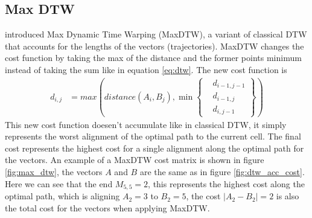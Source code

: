 \subsection{Max DTW}
\textcite{zhao2018rest} introduced Max Dynamic Time Warping (MaxDTW), a variant of classical DTW that accounts for the lengths of the vectors (trajectories). MaxDTW changes the cost function by taking the max of the distance and the former points minimum instead of taking the sum like in equation \ref{eq:dtw}. The new cost function is
\begin{equation}
    \label{eq:max_dtw}
    \begin{aligned}
        d_{i, j} & = max(distance(A_{i}, B_{j}), \min \left\{ \begin{aligned}
                                                                   & d_{i-1, j-1} \\
                                                                   & d_{i-1, j}   \\
                                                                   & d_{i, j-1}
                                                              \end{aligned} \right\})
    \end{aligned}
\end{equation}
This new cost function doesen't accumulate like in classical DTW, it simply represents the worst alignment of the optimal path to the current cell. The final cost represents the highest cost for a single alignment along the optimal path for the vectors. An example of a MaxDTW cost matrix is shown in figure \ref{fig:max_dtw}, the vectors $A$ and $B$ are the same as in figure \ref{fig:dtw_acc_cost}. Here we can see that the end $M_{5,5} = 2$, this represents the highest cost along the optimal path, which is aligning $A_2 = 3$ to $B_2 = 5$, the cost $|A_2 - B_2| = 2$ is also the total cost for the vectors when applying MaxDTW.
